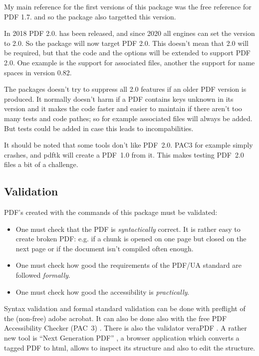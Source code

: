 \documentclass[DIV=12,parskip=half-,bibliography=totoc]{scrartcl}
\newcommand\PDF{PDF}
\begin{document}
My main reference for the first versions of this package
was the free reference for \PDF{} 1.7. \parencite{pdfreference} and so the package also targetted this version.

In 2018 \PDF{} 2.0. has been released, and since 2020 all engines can set the version to 2.0. So the package will
now target \PDF{} 2.0. This doesn't mean that 2.0 will be required, but that the code and the options will be extended to
support \PDF{} 2.0. One example is the support for associated files, another the support for name spaces in version 0.82.

The packages doesn't try to suppress all 2.0 features if an older \PDF{} version is produced. It normally doesn't harm if a \PDF{} contains keys unknown in its version and it makes the code faster and easier to maintain if there aren't too many tests and code pathes; so for example associated files will always be added. But tests could be added in case this leads to incompabilities.

It should be noted that some tools don't like \PDF{}~2.0.  PAC3 for example simply crashes, and pdftk will create a \PDF{}~1.0 from it. This makes testing \PDF{}~2.0 files a bit of a challenge.

\subsection{Validation}


\PDF{}'s created with the commands of this package must be validated:

\begin{itemize}
\item
 One must check that the \PDF{} is \emph{syntactically} correct. It is rather easy to create broken \PDF{}:
 e.g. if a chunk is opened on one page but closed on the next page or if the document isn't compiled often enough.

\item
One must check how good the requirements of the PDF/UA standard are followed \emph{formally}.

\item
One must check how good the accessibility is \emph{practically}.
\end{itemize}


Syntax validation and formal standard validation can be done with preflight of the (non-free) adobe acrobat.
It can also be done also with the free \PDF{} Accessibility Checker (PAC~3) \parencite{pac3}.
There is also the validator veraPDF \parencite{verapdf}.
A rather new tool is \enquote{Next Generation PDF} \parencite{ngpdf}, a browser application which converts a tagged PDF to html, allows to inspect its structure and also to edit the structure.
\end{document}

